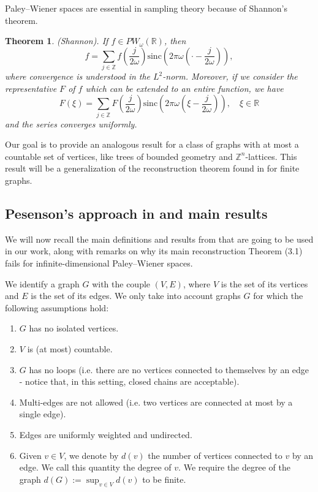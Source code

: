 \documentclass[12pt]{amsart}
\newtheorem{theorem}{Theorem}[section]
\theoremstyle{definition}
\numberwithin{equation}{section}
\theoremstyle{definition}
\theoremstyle{remark}
\numberwithin{equation}{section}
\begin{document}
Paley--Wiener spaces are essential in sampling theory because of Shannon's theorem.
\begin{theorem}
    \emph{(Shannon).} If $f \in PW_\omega(\mathbb{R})$, then
    \begin{equation}
       f = \sum_{j \in \mathbb{Z}}f\left(\frac{j}{2\omega}\right)\mathrm{sinc}\left(2\pi\omega\left(\cdot-\frac{j}{2\omega}\right)\right),
    \end{equation}
    where convergence is understood in the $L^2$-norm. Moreover, if we consider the representative $F$ of $f$ which can be extended to an entire function, we have
    \begin{equation}
    F(\xi) = \sum_{j \in \mathbb{Z}}F\left(\frac{j}{2\omega}\right)\mathrm{sinc}\left(2\pi\omega\left(\xi-\frac{j}{2\omega}\right)\right), \quad \xi \in \mathbb{R}
    \end{equation}
    and the series converges uniformly.
    \end{theorem}
Our goal is to provide an analogous result for a class of graphs with at most a countable set of vertices, like trees of bounded geometry and $\mathbb{Z}^n$-lattices. This result will be a generalization of the reconstruction theorem found in \cite{PW2} for finite graphs.

\subsection{Pesenson's approach in \cite{PW1} and main results}
We will now recall the main definitions and results from \cite{PW1} that are going to be used in our work, along with remarks on why its main reconstruction Theorem (3.1) fails for infinite-dimensional Paley--Wiener spaces.

We identify a graph $G$ with the couple $(V,E)$, where $V$ is the set of its vertices and $E$ is the set of its edges. We only take into account graphs $G$ for which the following assumptions hold:
\begin{enumerate}
    \item $G$ has no isolated vertices.
    \item $V$ is (at most) countable.
    \item $G$ has no loops (i.e. there are no vertices connected to themselves by an edge - notice that, in this setting, closed chains are acceptable).
    \item Multi-edges are not allowed (i.e. two vertices are connected at most by a single edge).
    \item Edges are uniformly weighted and undirected.
    \item Given $v \in V$, we denote by $d(v)$ the number of vertices connected to $v$ by an edge. We call this quantity the degree of $v$. We require the degree of the graph $d(G) := \sup_{v \in V}d(v)$ to be finite.
\end{enumerate}
\end{document}
